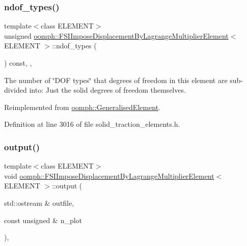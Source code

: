 \subsubsection{\texorpdfstring{ndof\+\_\+types()}{ndof\_types()}}
{\footnotesize\ttfamily template$<$class E\+L\+E\+M\+E\+NT$>$ \\
unsigned \hyperlink{classoomph_1_1FSIImposeDisplacementByLagrangeMultiplierElement}{oomph\+::\+F\+S\+I\+Impose\+Displacement\+By\+Lagrange\+Multiplier\+Element}$<$ E\+L\+E\+M\+E\+NT $>$\+::ndof\+\_\+types (\begin{DoxyParamCaption}{ }\end{DoxyParamCaption}) const\hspace{0.3cm}{\ttfamily [inline]}, {\ttfamily [protected]}, {\ttfamily [virtual]}}



The number of \char`\"{}\+D\+O\+F types\char`\"{} that degrees of freedom in this element are sub-\/divided into\+: Just the solid degrees of freedom themselves. 



Reimplemented from \hyperlink{classoomph_1_1GeneralisedElement_a0c6037a870597b35dcf1c780710b9a56}{oomph\+::\+Generalised\+Element}.



Definition at line 3016 of file solid\+\_\+traction\+\_\+elements.\+h.

\mbox{\label{classoomph_1_1FSIImposeDisplacementByLagrangeMultiplierElement_a473fab5e393ea6faa6d0939128660b0c}} 
\subsubsection{\texorpdfstring{output()}{output()}\hspace{0.1cm}{\footnotesize\ttfamily [1/2]}}
{\footnotesize\ttfamily template$<$class E\+L\+E\+M\+E\+NT$>$ \\
void \hyperlink{classoomph_1_1FSIImposeDisplacementByLagrangeMultiplierElement}{oomph\+::\+F\+S\+I\+Impose\+Displacement\+By\+Lagrange\+Multiplier\+Element}$<$ E\+L\+E\+M\+E\+NT $>$\+::output (\begin{DoxyParamCaption}\item[{std\+::ostream \&}]{outfile,  }\item[{const unsigned \&}]{n\+\_\+plot }\end{DoxyParamCaption})\hspace{0.3cm}{\ttfamily [inline]}, {\ttfamily [virtual]}}



